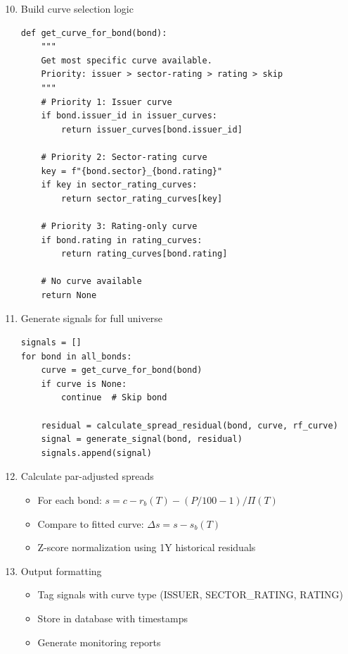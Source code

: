 \documentclass[11pt,a4paper]{article}
\begin{document}
\begin{enumerate}
    \setcounter{enumi}{9}
    \item Build curve selection logic
    \begin{lstlisting}
def get_curve_for_bond(bond):
    """
    Get most specific curve available.
    Priority: issuer > sector-rating > rating > skip
    """
    # Priority 1: Issuer curve
    if bond.issuer_id in issuer_curves:
        return issuer_curves[bond.issuer_id]
    
    # Priority 2: Sector-rating curve
    key = f"{bond.sector}_{bond.rating}"
    if key in sector_rating_curves:
        return sector_rating_curves[key]
    
    # Priority 3: Rating-only curve
    if bond.rating in rating_curves:
        return rating_curves[bond.rating]
    
    # No curve available
    return None
    \end{lstlisting}
    
    \item Generate signals for full universe
    \begin{lstlisting}
signals = []
for bond in all_bonds:
    curve = get_curve_for_bond(bond)
    if curve is None:
        continue  # Skip bond
    
    residual = calculate_spread_residual(bond, curve, rf_curve)
    signal = generate_signal(bond, residual)
    signals.append(signal)
    \end{lstlisting}
    
    \item Calculate par-adjusted spreads
    \begin{itemize}
        \item For each bond: $s = c - r_b(T) - (P/100 - 1)/\Pi(T)$
        \item Compare to fitted curve: $\Delta s = s - s_b(T)$
        \item Z-score normalization using 1Y historical residuals
    \end{itemize}
    
    \item Output formatting
    \begin{itemize}
        \item Tag signals with curve type (ISSUER, SECTOR\_RATING, RATING)
        \item Store in database with timestamps
        \item Generate monitoring reports
    \end{itemize}
\end{enumerate}
\end{document}
